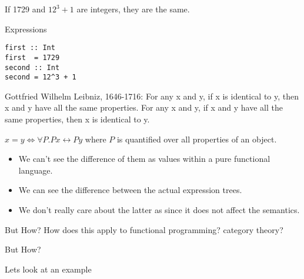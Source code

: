 \documentclass[tikz]{beamer}
\theoremstyle{definition}
\begin{document}
\begin{frame}[fragile]
If 1729 and $12^3+1$ are integers, they are the same.

\end{frame}

\begin{frame}[fragile]{Expressions}

\begin{verbatim}
first :: Int
first  = 1729
second :: Int
second = 12^3 + 1
\end{verbatim}
\end{frame}


\begin{frame}
\begin{block}{Gottfried Wilhelm Leibniz, 1646-1716:}
For any x and y, if x is identical to y, then x and y have all the same properties.
For any x and y, if x and y have all the same properties, then x is identical to y.
\end{block}
\end{frame}

\begin{frame}

$x = y \Leftrightarrow \forall P. P x \leftrightarrow P y$ where $P$ is quantified over all properties of an object.

\end{frame}


\begin{frame}

\begin{itemize}
\item We can't see the difference of them as values within a pure functional language.
\item We can see the difference between the actual expression trees.
\item We don't really care about the latter as since it does not affect the semantics.
\end{itemize}

\end{frame}


\begin{frame}{But How?}
    How does this apply to functional programming? category theory?


\end{frame}{}

\begin{frame}{But How?}

 Lets look at an example

\end{frame}{}
\end{document}

